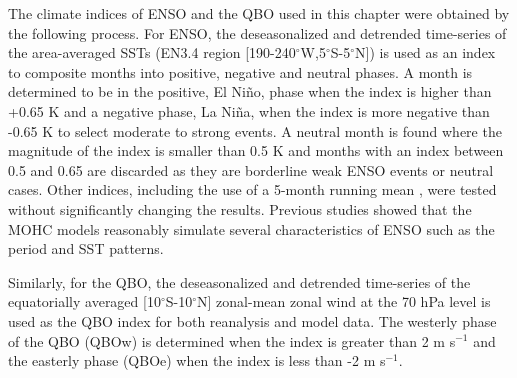 The climate indices of ENSO and the QBO used in this chapter were obtained by the following process. 
For ENSO, the deseasonalized and detrended time-series of the area-averaged SSTs (EN3.4 region [190-240$^\circ$W,5$^\circ$S-5$^\circ$N]) is used as an index to composite months into positive, negative and neutral phases. 
A month is determined to be in the positive, El Niño, phase when the index is higher than +0.65 K and a negative phase, La Niña, when the index is more negative than -0.65 K to select moderate to strong events. A neutral month is found where the magnitude of the index is smaller than 0.5 K and months with an index between 0.5 and 0.65 are discarded as they are borderline weak ENSO events or neutral cases.  Other indices, including the use of a 5-month running mean \citep{trenberth1998}, were tested without significantly changing the results.   Previous studies \citep[e.g.][]{menary2018,kuhlbrodt2018}  showed that the MOHC models reasonably simulate several characteristics of ENSO such as the period and SST patterns.

Similarly, for the QBO, the deseasonalized and detrended time-series of the equatorially averaged [10$^\circ$S-10$^\circ$N] zonal-mean zonal wind at the 70 hPa level is used as the QBO index for both reanalysis and model data. The westerly phase of the QBO (QBOw) is determined when the index is greater than 2 m s$^{-1}$ and the easterly phase (QBOe) when the index is less than -2 m s$^{-1}$. 


% 



